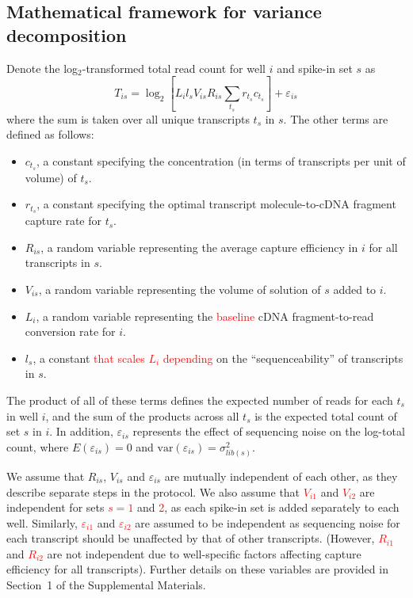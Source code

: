 \documentclass{article}
\newcommand{\suppsecmath}{1}
\newcommand{\revised}[1]{\textcolor{red}{#1}}
\newcommand\variance{\mbox{var}}
\begin{document}
\subsection*{Mathematical framework for variance decomposition}
Denote the log$_2$-transformed total read count for well $i$ and spike-in set $s$ as
\[
T_{is} = \log_2 \left[ L_i l_s V_{is} R_{is} \sum_{t_s} r_{t_s} c_{t_s} \right] + \varepsilon_{is}
\]
where the sum is taken over all unique transcripts $t_s$ in $s$.
The other terms are defined as follows:
\begin{itemize}
    \item $c_{t_s}$, a constant specifying the concentration (in terms of transcripts per unit of volume) of $t_s$.
    \item $r_{t_s}$, a constant specifying the optimal transcript molecule-to-cDNA fragment capture rate for $t_s$.
    \item $R_{is}$, a random variable representing the average capture efficiency in $i$ for all transcripts in $s$.
    \item $V_{is}$, a random variable representing the volume of solution of $s$ added to $i$.
    \item $L_i$, a random variable representing the \revised{baseline} cDNA fragment-to-read conversion rate for $i$.
    \item $l_s$, a constant \revised{that scales $L_i$ depending} on the ``sequenceability'' of transcripts in $s$.
\end{itemize}
The product of all of these terms defines the expected number of reads for each $t_s$ in well $i$, and the sum of the products across all $t_s$ is the expected total count of set $s$ in $i$.
In addition, $\varepsilon_{is}$ represents the effect of sequencing noise on the log-total count, where $E(\varepsilon_{is})=0$ and $\variance(\varepsilon_{is})= \sigma^2_{lib(s)}$.

We assume that $R_{is}$, $V_{is}$ and $\varepsilon_{is}$ are mutually independent of each other, as they describe separate steps in the protocol.
We also assume that \revised{$V_{i1}$} and \revised{$V_{i2}$} are independent for sets \revised{$s=1$} and \revised{2}, as each spike-in set is added separately to each well.
Similarly, \revised{$\varepsilon_{i1}$} and \revised{$\varepsilon_{i2}$} are assumed to be independent as sequencing noise for each transcript should be unaffected by that of other transcripts.
(However, \revised{$R_{i1}$} and \revised{$R_{i2}$} are not independent due to well-specific factors affecting capture efficiency for all transcripts).
Further details on these variables are provided in Section~\suppsecmath{} of the Supplemental Materials.
\end{document}

